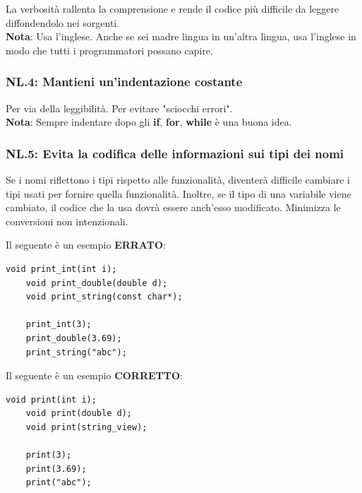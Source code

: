 \textsf{\small La verbosità rallenta la comprensione e rende il codice più difficile da leggere diffondendolo nei sorgenti.} \\

\textsf{\small \textbf{Nota}: Usa l'inglese. Anche se sei madre lingua in un'altra lingua, usa l'inglese in modo che tutti i programmatori possano capire.} \\

\subsubsection{NL.4: Mantieni un'indentazione costante}

\textsf{\small Per via della leggibilità. Per evitare "sciocchi errori".} \\

\textsf{\small \textbf{Nota}: Sempre indentare dopo gli \textbf{if}, \textbf{for}, \textbf{while} è una buona idea.} \\

\subsubsection{NL.5: Evita la codifica delle informazioni sui tipi dei nomi} %

\textsf{\small Se i nomi riflettono i tipi rispetto alle funzionalità, diventerà difficile cambiare i tipi usati per fornire quella funzionalità. Inoltre, se il tipo di una variabile viene cambiato, il codice che la usa dovrà essere anch'esso modificato. Minimizza le conversioni non intenzionali.} \break

\textsf{\small Il seguente è un esempio \textbf{\color{red} ERRATO}\normalcolor:} \\


\begin{lstlisting}[frame=single, rulecolor=\color{red}]
	void print_int(int i);
	void print_double(double d);
	void print_string(const char*);
	
	print_int(3);
	print_double(3.69);
	print_string("abc");
\end{lstlisting}

\textsf{\small Il seguente è un esempio \textbf{\color{ForestGreen} CORRETTO}\normalcolor:} \\

\begin{lstlisting}[frame=single, rulecolor=\color{ForestGreen}]
	void print(int i);
	void print(double d);
	void print(string_view);
	
	print(3);
	print(3.69);
	print("abc");
\end{lstlisting}

